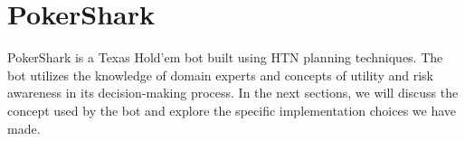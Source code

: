\chapter{PokerShark}
\label{chap:PokerShark}

PokerShark is a Texas Hold'em bot built using HTN planning techniques. The bot utilizes the knowledge of domain experts and concepts of utility and risk awareness in its decision-making process. In the next sections, we will discuss the concept used by the bot and explore the specific implementation choices we have made.









